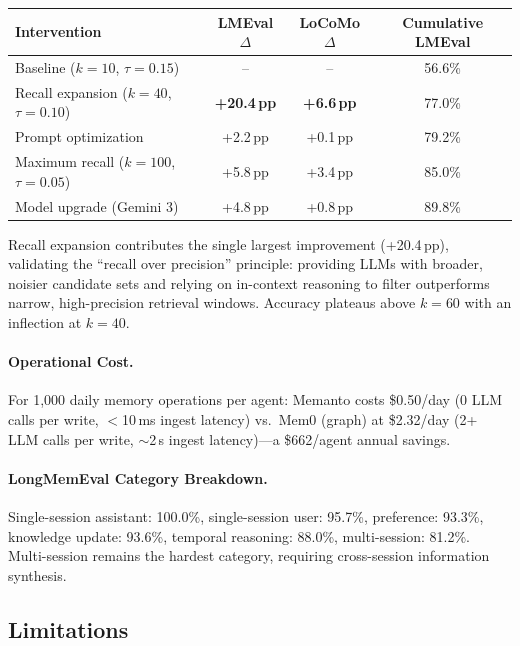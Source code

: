 \documentclass[11pt]{article}
\begin{document}
\begin{center}
\begin{tabular}{lccc}
\toprule
\textbf{Intervention} & \textbf{LMEval $\Delta$} & \textbf{LoCoMo $\Delta$} & \textbf{Cumulative LMEval} \\
\midrule
Baseline ($k{=}10$, $\tau{=}0.15$) & -- & -- & 56.6\% \\
Recall expansion ($k{=}40$, $\tau{=}0.10$) & \textbf{+20.4\,pp} & \textbf{+6.6\,pp} & 77.0\% \\
Prompt optimization & +2.2\,pp & +0.1\,pp & 79.2\% \\
Maximum recall ($k{=}100$, $\tau{=}0.05$) & +5.8\,pp & +3.4\,pp & 85.0\% \\
Model upgrade (Gemini 3) & +4.8\,pp & +0.8\,pp & 89.8\% \\
\bottomrule
\end{tabular}
\end{center}

Recall expansion contributes the single largest improvement (+20.4\,pp), validating the ``recall over precision'' principle: providing LLMs with broader, noisier candidate sets and relying on in-context reasoning to filter outperforms narrow, high-precision retrieval windows. Accuracy plateaus above $k{=}60$ with an inflection at $k{=}40$.

\paragraph{Operational Cost.}
For 1,000 daily memory operations per agent: Memanto costs \$0.50/day (0 LLM calls per write, $<$10\,ms ingest latency) vs.\ Mem0 (graph) at \$2.32/day (2+ LLM calls per write, $\sim$2\,s ingest latency)---a \$662/agent annual savings.

\paragraph{LongMemEval Category Breakdown.}
Single-session assistant: 100.0\%, single-session user: 95.7\%, preference: 93.3\%, knowledge update: 93.6\%, temporal reasoning: 88.0\%, multi-session: 81.2\%. Multi-session remains the hardest category, requiring cross-session information synthesis.

\subsection{Limitations}
\end{document}
